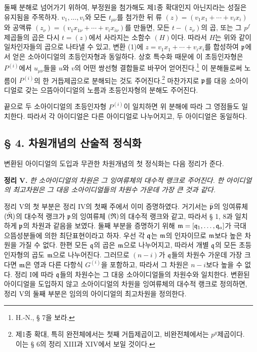 둘째 분해로 넘어가기 위하여, 부정원을 첨가해도 제1종 확대인지 아닌지라는 성질은 유지됨을 주목하자. \(v_1,\ldots,v_i\)와 모든 \(t_{\mu\nu}\)를 첨가한 뒤 류 \((z)=(v_1x_1+\cdots+v_ix_i)\)와 공액류 \((z_\nu)=(v_1x_{1\nu}+\cdots+v_ix_{i\nu})\)를 만들면, 모든 \(t-(z_\nu)\)의 곱, 또는 그 \(p^f\)제곱들의 곱은 다시 \(t=(z)\)에서 사라지는 소함수 \((H)\)이다. 따라서 \(H\)는 위와 같이 일차인자들의 곱으로 나타낼 수 있고, 변환 (1)에 \(z=v_1x_1+\cdots+v_ix_i\)를 합성하여 \(\mathfrak p\)에서 얻은 소아이디얼의 초등인자형과 동일하다. 상호 특수화 때문에 이 초등인자형은 \(P^{(i)}\)에서 \(u_{\mu\nu}\)들을 \(u\)와 \(v\)의 어떤 쌍선형 결합들로 바꾸어 얻어진다.\footnote{H.-N., § 7을 보라.} 이 분해들로써 노름이 \(P^{(i)}\)의 한 거듭제곱으로 분해되는 것도 주어진다.\footnote{제1종 확대, 특히 완전체에서는 첫째 거듭제곱이고, 비완전체에서는 \(p^g\)제곱이다. 이는 § 6의 정리 XIII과 XIV에서 보일 것이다.} 마찬가지로 \(\mathfrak p\)를 대응 소아이디얼로 갖는 으뜸아이디얼의 노름과 초등인자형의 분해도 주어진다.

끝으로 두 소아이디얼의 초등인자형 \(P^{(i)}\)이 일치하면 위 분해에 따라 그 영점들도 일치한다. 따라서 각 아이디얼은 다른 아이디얼로 나누어지고, 두 아이디얼은 동일하다.

\subsection*{§ 4. 차원개념의 산술적 정식화}

변환된 아이디얼의 도입과 무관한 차원개념의 첫 정식화는 다음 정리가 준다.

\textbf{정리 V.} \emph{한 소아이디얼의 차원은 그 잉여류체의 대수적 랭크로 주어진다. 한 아이디얼의 최고차원은 그 대응 소아이디얼들의 차원수 가운데 가장 큰 것과 같다.}

정리 V의 첫 부분은 정리 IV의 첫째 주에서 이미 증명하였다. 거기서는 \(\bar{\mathfrak p}\)의 잉여류체 \((\bar{\mathfrak{R}})\)의 대수적 랭크가 \(\mathfrak p\)의 잉여류체 \((\mathfrak{R})\)의 대수적 랭크와 같고, 따라서 § 1, 8과 일치하게 \(\mathfrak p\)의 차원과 같음을 보였다. 둘째 부분을 증명하기 위해 \(\mathfrak m=[\mathfrak q_1,\ldots,\mathfrak q_a]\)가 극대 으뜸성분들에 의한 최단표현이라고 하자. 우선 각 \(\mathfrak q\)는 \(\mathfrak m\)의 인자이므로 \(\mathfrak m\)보다 높은 차원을 가질 수 없다. 한편 모든 \(\mathfrak q\)의 곱은 \(\mathfrak m\)으로 나누어지고, 따라서 개별 \(\mathfrak q\)의 모든 초등인자형의 곱도 \(\mathfrak m\)으로 나누어진다. 그러므로 \((n-i)\)가 \(\mathfrak q\)들의 차원수 가운데 가장 크다면 \(\mathfrak m\)은 영과 다른 다항식 \(G^{(i)}\)을 포함하고, 따라서 그 차원은 \(n-i\)보다 높을 수 없다. 정리 I에 따라 \(\mathfrak q\)들의 차원수는 그 대응 소아이디얼들의 차원수와 일치한다. 변환된 아이디얼을 도입하지 않고 소아이디얼의 차원을 잉여류체의 대수적 랭크로 정의하면, 정리 V의 둘째 부분은 임의의 아이디얼의 최고차원을 정의한다.

